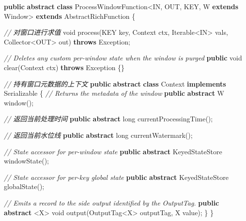 \documentclass[cn,11pt,chinese]{elegantbook}
\newenvironment{Shaded}{}{}
\newcommand{\BuiltInTok}[1]{#1}
\newcommand{\CommentTok}[1]{\textcolor[rgb]{0.38,0.63,0.69}{\textit{#1}}}
\newcommand{\DataTypeTok}[1]{\textcolor[rgb]{0.56,0.13,0.00}{#1}}
\newcommand{\FunctionTok}[1]{\textcolor[rgb]{0.02,0.16,0.49}{#1}}
\newcommand{\KeywordTok}[1]{\textcolor[rgb]{0.00,0.44,0.13}{\textbf{#1}}}
\newcommand{\NormalTok}[1]{#1}
\begin{document}
\begin{Shaded}
\begin{Highlighting}[]
\KeywordTok{public} \KeywordTok{abstract} \KeywordTok{class}\NormalTok{ ProcessWindowFunction\textless{}IN, OUT, KEY, W }\KeywordTok{extends} \BuiltInTok{Window}\NormalTok{\textgreater{} }\KeywordTok{extends}\NormalTok{ AbstractRichFunction \{}

  \CommentTok{// 对窗口进行求值}
  \DataTypeTok{void} \FunctionTok{process}\NormalTok{(KEY key, }\BuiltInTok{Context}\NormalTok{ ctx, }\BuiltInTok{Iterable}\NormalTok{\textless{}IN\textgreater{} vals, Collector\textless{}OUT\textgreater{} out)}
    \KeywordTok{throws} \BuiltInTok{Exception}\NormalTok{;}

  \CommentTok{// Deletes any custom per{-}window state when the window is purged}
  \KeywordTok{public} \DataTypeTok{void} \FunctionTok{clear}\NormalTok{(}\BuiltInTok{Context}\NormalTok{ ctx) }\KeywordTok{throws} \BuiltInTok{Exception}\NormalTok{ \{\}}

  \CommentTok{// 持有窗口元数据的上下文}
  \KeywordTok{public} \KeywordTok{abstract} \KeywordTok{class} \BuiltInTok{Context} \KeywordTok{implements} \BuiltInTok{Serializable}\NormalTok{ \{}
    \CommentTok{// Returns the metadata of the window}
    \KeywordTok{public} \KeywordTok{abstract}\NormalTok{ W }\FunctionTok{window}\NormalTok{();}

    \CommentTok{// 返回当前处理时间}
    \KeywordTok{public} \KeywordTok{abstract} \DataTypeTok{long} \FunctionTok{currentProcessingTime}\NormalTok{();}

    \CommentTok{// 返回当前水位线}
    \KeywordTok{public} \KeywordTok{abstract} \DataTypeTok{long} \FunctionTok{currentWatermark}\NormalTok{();}

    \CommentTok{// State accessor for per{-}window state}
    \KeywordTok{public} \KeywordTok{abstract}\NormalTok{ KeyedStateStore }\FunctionTok{windowState}\NormalTok{();}

    \CommentTok{// State accessor for per{-}key global state}
    \KeywordTok{public} \KeywordTok{abstract}\NormalTok{ KeyedStateStore }\FunctionTok{globalState}\NormalTok{();}

    \CommentTok{// Emits a record to the side output identified by the OutputTag.}
    \KeywordTok{public} \KeywordTok{abstract}\NormalTok{ \textless{}X\textgreater{} }\DataTypeTok{void} \FunctionTok{output}\NormalTok{(OutputTag\textless{}X\textgreater{} outputTag, X value);}
\NormalTok{  \}}
\NormalTok{\}}
\end{Highlighting}
\end{Shaded}
\end{document}
